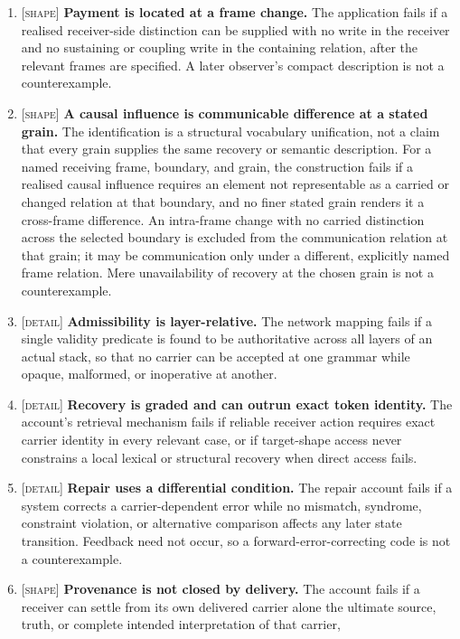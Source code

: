 \documentclass[11pt,a4paper]{article}
\theoremstyle{remark}\newtheorem{remark}[definition]{Remark}
\begin{document}
\begin{enumerate}[leftmargin=*]
\item \textsc{[shape]} \textbf{Payment is located at a frame change.} The
application fails if a realised receiver-side distinction can be supplied with no
write in the receiver and no sustaining or coupling write in the containing
relation, after the relevant frames are specified. A later observer's compact
description is not a counterexample.
\item \textsc{[shape]} \textbf{A causal influence is communicable difference at a stated grain.}
The identification is a structural vocabulary unification, not a claim that every grain supplies the
same recovery or semantic description. For a named receiving frame, boundary, and grain, the
construction fails if a realised causal influence requires an element not representable as a carried or
changed relation at that boundary, and no finer stated grain renders it a cross-frame difference. An
intra-frame change with no carried distinction across the selected boundary is excluded from the
communication relation at that grain; it may be communication only under a different, explicitly named
frame relation. Mere unavailability of recovery at the chosen grain is not a counterexample.
\item \textsc{[detail]} \textbf{Admissibility is layer-relative.} The network
mapping fails if a single validity predicate is found to be authoritative across
all layers of an actual stack, so that no carrier can be accepted at one grammar
while opaque, malformed, or inoperative at another.
\item \textsc{[detail]} \textbf{Recovery is graded and can outrun exact token
identity.} The account's retrieval mechanism fails if reliable receiver action
requires exact carrier identity in every relevant case, or if target-shape access
never constrains a local lexical or structural recovery when direct access fails.
\item \textsc{[detail]} \textbf{Repair uses a differential condition.} The
repair account fails if a system corrects a carrier-dependent error while no
mismatch, syndrome, constraint violation, or alternative comparison affects any
later state transition. Feedback need not occur, so a forward-error-correcting
code is not a counterexample.
\item \textsc{[shape]} \textbf{Provenance is not closed by delivery.} The
account fails if a receiver can settle from its own delivered carrier alone the
ultimate source, truth, or complete intended interpretation of that carrier,

\end{enumerate}
\end{document}
